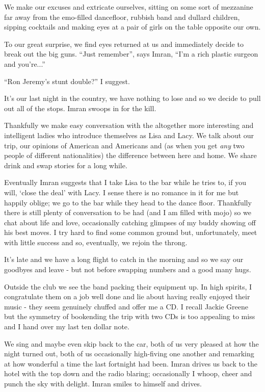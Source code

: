 \documentclass[a5paper,titlepage,11pt]{book}
\begin{document}
We make our excuses and extricate ourselves, sitting on some sort of mezzanine far away from the emo-filled dancefloor, rubbish band and dullard children, sipping cocktails and making eyes at a pair of girls on the table opposite our own.

To our great surprise, we find eyes returned at us and immediately decide to break out the big guns.  ``Just remember'', says Imran, ``I'm a rich plastic surgeon and you're...''

``Ron Jeremy's stunt double?'' I suggest.

It's our last night in the country, we have nothing to lose and so we decide to pull out all of the stops.  Imran swoops in for the kill.

Thankfully we make easy conversation with the altogether more interesting and intelligent ladies who introduce themselves as Lisa and Lacy.  We talk about our trip, our opinions of American and Americans and (as when you get \emph{any} two people of different nationalities) the difference between here and home.  We share drink and swap stories for a long while.

Eventually Imran suggests that I take Lisa to the bar while he tries to, if you will, `close the deal' with Lacy.  I sense there is no romance in it for me but happily oblige; we go to the bar while they head to the dance floor.  Thankfully there is still plenty of conversation to be had (and I am filled with mojo) so we chat about life and love, occasionally catching glimpses of my buddy showing off his best moves.  I try hard to find some common ground but, unfortunately, meet with little success and so, eventually, we rejoin the throng.

It's late and we have a long flight to catch in the morning and so we say our goodbyes and leave - but not before swapping numbers and a good many hugs.

Outside the club we see the band packing their equipment up.  In high spirits, I congratulate them on a job well done and lie about having really enjoyed their music - they seem genuinely chuffed and offer me a CD.  I recall Jackie Greene but the symmetry of bookending the trip with two CDs is too appealing to miss and I hand over my last ten dollar note.

We sing and maybe even skip back to the car, both of us very pleased at how the night turned out, both of us occasionally high-fiving one another and remarking at how wonderful a time the last fortnight had been.  Imran drives us back to the hotel with the top down and the radio blaring; occasionally I whoop, cheer and punch the sky with delight.  Imran smiles to himself and drives.
\end{document}
